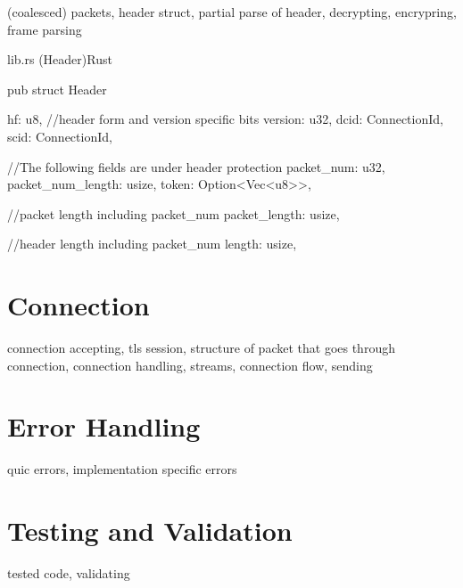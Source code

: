 (coalesced) packets, header struct, partial parse of header, decrypting, encrypring, frame parsing

\begin{codeblock}{lib.rs (Header)}{Rust}
  \begin{rustcode}
    pub struct Header {
        hf: u8, //header form and version specific bits
        version: u32,
        dcid: ConnectionId,
        scid: ConnectionId,
    
        //The following fields are under header protection
        packet_num: u32,
        packet_num_length: usize,
        token: Option<Vec<u8>>,
    
        //packet length including packet_num
        packet_length: usize,
    
        //header length including packet_num
        length: usize,
    }
  \end{rustcode}
\end{codeblock}

\section{Connection}

connection accepting, tls session, structure of packet that goes through connection, connection handling, streams, connection flow, sending

\section{Error Handling}

quic errors, implementation specific errors

\section{Testing and Validation}

tested code, validating